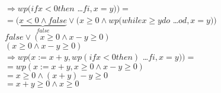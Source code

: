 $\Rightarrow wp(if x<0 then $ \dots $ fi, x=y)) =$\\
$ = (\underbrace{x<0 \land false}_{false} \lor 
  (x \geq 0 \land wp(while x\geq y do$ \dots $od, x=y))$\\
$false \lor (x\geq 0 \land x-y \geq 0)$\\
$(x\geq 0 \land x-y \geq 0)$\\

$\Rightarrow wp(x:=x+y, wp(if x<0 then)$ \dots $fi, x=y)) = $\\
$= wp(x:=x+y, x\geq 0 \land x-y\geq0)$\\
$= x\geq 0 \land (x+y)-y\geq 0$\\
$= x+y \geq 0 \land x\geq 0$



